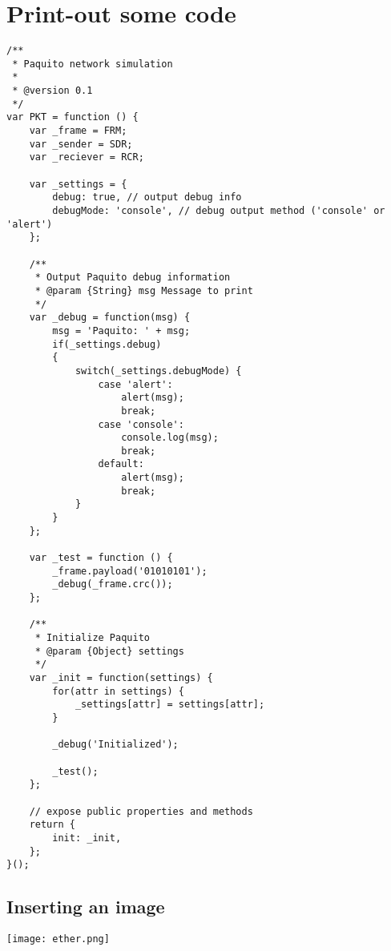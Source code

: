 \section{Print-out some code}

\begin{lstlisting}[caption=My Javascript Example]
/**
 * Paquito network simulation
 * 
 * @version 0.1
 */
var PKT = function () {
	var _frame = FRM;
	var _sender = SDR;
	var _reciever = RCR;
	
	var _settings = {
		debug: true, // output debug info
		debugMode: 'console', // debug output method ('console' or 'alert')
	};
	
	/**
	 * Output Paquito debug information
	 * @param {String} msg Message to print
	 */
	var _debug = function(msg) {
		msg = 'Paquito: ' + msg;
		if(_settings.debug)
		{
			switch(_settings.debugMode) {
				case 'alert':
					alert(msg);
					break;
				case 'console':
					console.log(msg);
					break;
				default:
					alert(msg);
					break;
			}
		}
	};

	var _test = function () {
		_frame.payload('01010101');
		_debug(_frame.crc());
	};
	
	/**
	 * Initialize Paquito
	 * @param {Object} settings
	 */
	var _init = function(settings) {
		for(attr in settings) {
			_settings[attr] = settings[attr];
		}
		
		_debug('Initialized');
		
		_test();
	};
	
	// expose public properties and methods
	return {
		init: _init,
	};
}();
\end{lstlisting}

\subsection{Inserting an image}

\begin{center}
\texttt{[image: ether.png]}
\end{center}

